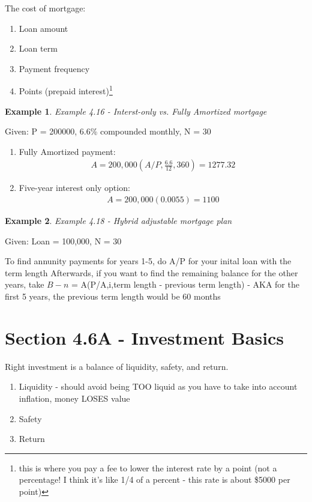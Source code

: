 \documentclass{report} %
\newtheorem{exmp}{Example}
\begin{document}
The cost of mortgage:
\begin{enumerate}
    \item Loan amount
    \item Loan term
    \item Payment frequency
    \item Points (prepaid interest)\footnote{this is where you pay a fee to lower the interest rate by a point (not a percentage! I think it's like 1/4 of a percent - this rate is about \$5000 per point)}
\end{enumerate}

\begin{exmp}
    Example 4.16 - Interst-only vs. Fully Amortized mortgage
\end{exmp}
\begin{center}
    Given: P = 200000, 6.6\% compounded monthly, N = 30
\end{center}
\begin{enumerate}
    \item Fully Amortized payment:
    \begin{equation*}
        \begin{aligned}
            A = 200,000(A/P,\frac{6.6}{12},360) = 1277.32
        \end{aligned}
    \end{equation*}
    \item Five-year interest only option:
    \begin{equation*}
        \begin{aligned}
            A = 200,000(0.0055) = 1100
        \end{aligned}
    \end{equation*}
\end{enumerate}

\begin{exmp}
    Example 4.18 - Hybrid adjustable mortgage plan
\end{exmp}
\begin{center}
    Given: Loan = 100,000, N = 30
\end{center}

To find annunity payments for years 1-5, do A/P for your inital loan with the term length
Afterwards, if you want to find the remaining balance for the other years, take $B-n$ = A(P/A,i,term length - previous term length) - AKA for the first 5 years, the previous term length would be 60 months

\section*{Section 4.6A - Investment Basics}
Right investment is a balance of liquidity, safety, and return.
\begin{enumerate}
    \item Liquidity - should avoid being TOO liquid as you have to take into account inflation, money LOSES value
    \item Safety
    \item Return
\end{enumerate}
\end{document}
